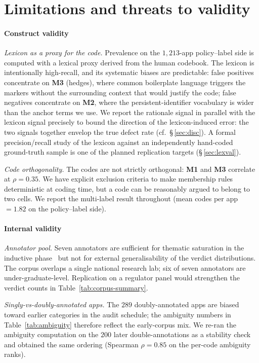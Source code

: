 \documentclass[11pt,a4paper]{article}
\newcommand{\code}[1]{\textsf{\textbf{#1}}}
\begin{document}
\section{Limitations and threats to validity}\label{sec:lim}

\paragraph{Construct validity}
\emph{Lexicon as a proxy for the code.} Prevalence on the
$1{,}213$-app policy--label side is computed with a lexical proxy
derived from the human codebook. The lexicon is intentionally
high-recall, and its systematic biases are predictable: false
positives concentrate on \code{M3} (hedges), where common
boilerplate language triggers the markers without the surrounding
context that would justify the code; false negatives concentrate on
\code{M2}, where the persistent-identifier vocabulary is wider than
the anchor terms we use. We report the rationale signal in parallel
with the lexicon signal precisely to bound the direction of the
lexicon-induced error: the two signals together envelop the true
defect rate (cf.~\S\,\ref{sec:disc}). A formal precision/recall
study of the lexicon against an independently hand-coded
ground-truth sample is one of the planned replication targets
(\S\,\ref{sec:lexval}).

\emph{Code orthogonality.} The codes are not strictly orthogonal:
\code{M1} and \code{M3} correlate at $\rho=0.35$. We have explicit
exclusion criteria to make membership rules deterministic at coding
time, but a code can be reasonably argued to belong to two cells.
We report the multi-label result throughout (mean codes per app
$=1.82$ on the policy--label side).

\paragraph{Internal validity}
\emph{Annotator pool.} Seven annotators are sufficient for thematic
saturation in the inductive phase~\citep{braun2006using} but not for
external generalisability of the verdict distributions. The corpus
overlaps a single national research lab; six of seven annotators are
under-graduate-level. Replication on a regulator panel would
strengthen the verdict counts in Table~\ref{tab:corpus-summary}.

\emph{Singly-vs-doubly-annotated apps.} The $289$ doubly-annotated
apps are biased toward earlier categories in the audit schedule;
the ambiguity numbers in Table~\ref{tab:ambiguity} therefore reflect
the early-corpus mix. We re-ran the ambiguity computation on the
$200$ later double-annotations as a stability check and obtained
the same ordering (Spearman $\rho=0.85$ on the per-code ambiguity
ranks).
\end{document}
